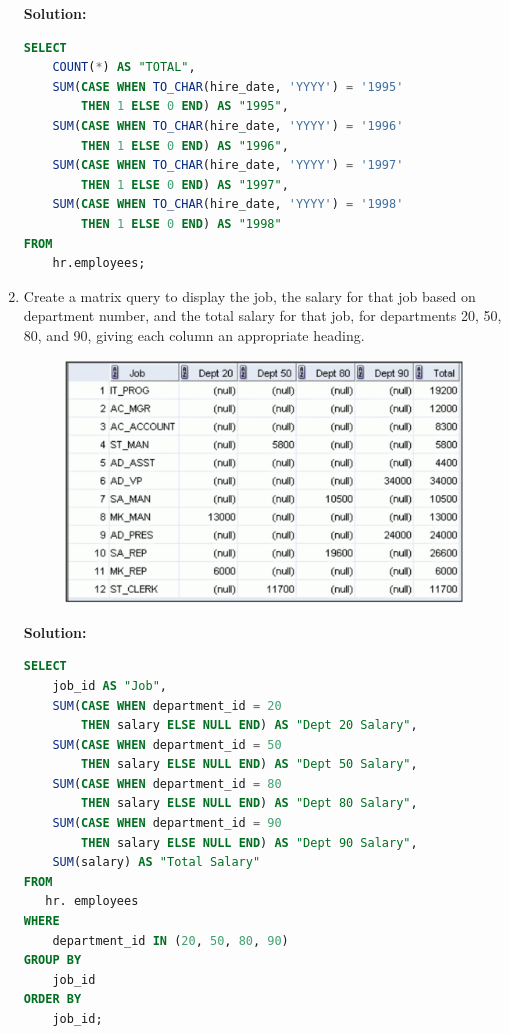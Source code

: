 \documentclass[a4paper,12pt]{article}
\begin{document}
\begin{enumerate}
    \textbf{Solution: }
    \begin{lstlisting}[language=SQL]
SELECT 
    COUNT(*) AS "TOTAL",
    SUM(CASE WHEN TO_CHAR(hire_date, 'YYYY') = '1995' 
        THEN 1 ELSE 0 END) AS "1995",
    SUM(CASE WHEN TO_CHAR(hire_date, 'YYYY') = '1996' 
        THEN 1 ELSE 0 END) AS "1996",
    SUM(CASE WHEN TO_CHAR(hire_date, 'YYYY') = '1997' 
        THEN 1 ELSE 0 END) AS "1997",
    SUM(CASE WHEN TO_CHAR(hire_date, 'YYYY') = '1998'
        THEN 1 ELSE 0 END) AS "1998"
FROM 
    hr.employees;
    \end{lstlisting}
    \item Create a matrix query to display the job, the salary for that job based on department number,
and the total salary for that job, for departments 20, 50, 80, and 90, giving each column an
appropriate heading.
    \begin{figure}[h]
        \centering
        \includegraphics[width=.5\linewidth]{graphics/611.png}
    \end{figure}

    \textbf{Solution: }
    \begin{lstlisting}[language=SQL]
SELECT 
    job_id AS "Job",
    SUM(CASE WHEN department_id = 20 
        THEN salary ELSE NULL END) AS "Dept 20 Salary",
    SUM(CASE WHEN department_id = 50 
        THEN salary ELSE NULL END) AS "Dept 50 Salary",
    SUM(CASE WHEN department_id = 80 
        THEN salary ELSE NULL END) AS "Dept 80 Salary",
    SUM(CASE WHEN department_id = 90 
        THEN salary ELSE NULL END) AS "Dept 90 Salary",
    SUM(salary) AS "Total Salary"
FROM 
   hr. employees
WHERE 
    department_id IN (20, 50, 80, 90)
GROUP BY 
    job_id
ORDER BY 
    job_id;

    \end{lstlisting}
\end{enumerate}
\end{document}
